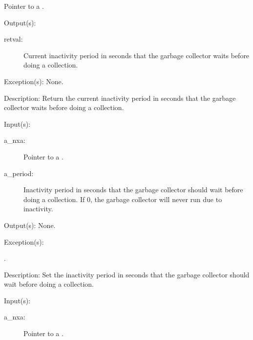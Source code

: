 \begin{capi}
\begin{capilist}
\begin{description}
			Pointer to a .
		\end{description}
	\item[Output(s): ]
		\begin{description}\item[]
		\item[retval: ]
			Current inactivity period in seconds that the garbage
			collector waits before doing a collection.
		\end{description}
	\item[Exception(s): ] None.
	\item[Description: ]
		Return the current inactivity period in seconds that the garbage
		collector waits before doing a collection.
	\end{capilist}
\label{nxa_period_set}
	\begin{capilist}
	\item[Input(s): ]
		\begin{description}\item[]
		\item[a\_nxa: ]
			Pointer to a .
		\item[a\_period: ]
			Inactivity period in seconds that the garbage collector
			should wait before doing a collection.  If 0, the
			garbage collector will never run due to inactivity.
		\end{description}
	\item[Output(s): ] None.
	\item[Exception(s): ]
		\begin{description}\item[]
		\item[.]
		\end{description}
	\item[Description: ]
		Set the inactivity period in seconds that the garbage collector
		should wait before doing a collection.
	\end{capilist}
\label{nxa_threshold_get}
	\begin{capilist}
	\item[Input(s): ]
		\begin{description}\item[]
		\item[a\_nxa: ]
			Pointer to a \classname{nxa}.

\end{description}
\end{capilist}
\end{capi}
